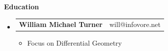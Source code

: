 \documentclass[letterpaper,11pt]{article}
\makeatletter
\newcommand{\resitem}[1]{\item #1 \vspace{-1pt}}
\newcommand{\resheading}[1]{{\large \color{white} \colorbox{myBlue}{\begin{minipage}{\textwidth}{\textbf{#1 \vphantom{p\^{E}}}}\end{minipage}}}}
\newcommand{\ressubheading}[4]{
\begin{tabular*}{7.3in}{l@{\extracolsep{\fill}}r} \color{myRed}
\textbf{\large William Michael Turner} & will@infovore.net \\
\end{tabular*}\vspace{-5pt}}
\makeatother
\begin{document}
\resheading{Education}
\begin{itemize}
\item
    \ressubheading{Moorpark College}{Moorpark, CA}{Coursework towards Pure Mathematics}{2009 - 2013}
    \begin{itemize}
        \resitem{Focus on Differential Geometry}
    \end{itemize}

\end{itemize}
\end{document}
